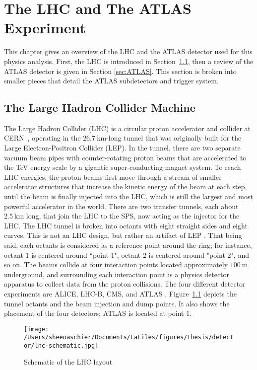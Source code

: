 \chapter{The LHC and The ATLAS Experiment}
\label{ch:detector}
This chapter gives an overview of the LHC and the ATLAS detector used for this physics analysis.  First, the LHC is introduced in Section~\ref{sec:LHC}, then a review of the ATLAS detector is given in Section \ref{sec:ATLAS}.  This section is broken into smaller pieces that detail the ATLAS subdetectors and trigger system. %
\section{The Large Hadron Collider Machine}
\label{sec:LHC}

The Large Hadron Collider (LHC) is a circular proton accelerator and collider at CERN~\cite{Evans:2008zzb}, operating in the $26.7~\mathrm{km}$-long tunnel that was originally built for the Large Electron-Positron Collider (LEP).  In the tunnel, there are two separate vacuum beam pipes with counter-rotating proton beams that are accelerated to the TeV energy scale by a gigantic super-conducting magnet system.  To reach LHC energies, the proton beams first move through a stream of smaller accelerator structures that increase the kinetic energy of the beam at each step, until the beam is finally injected into the LHC, which is still the largest and most powerful accelerator in the world.  There are two transfer tunnels, each about $2.5~\mathrm{km}$ long, that join the LHC to the SPS, now acting as the injector for the LHC.  The LHC tunnel is broken into octants with eight straight sides and eight curves.  This is not an LHC design, but rather an artifact of LEP \cite{lep}.   That being said, each octants is considered as a reference point around the ring; for instance, octant 1 is centered around ``point 1", octant 2 is centered around "point 2", and so on.  The beams collide at four interaction points located approximately $100~\mathrm{m}$ underground, and surrounding each interaction point is a physics detector apparatus to collect data from the proton collisions.  The four different detector experiments are ALICE, LHC-B, CMS, and ATLAS \cite{Jean-Luc:841555}.  Figure~\ref{fig:lhc} depicts the tunnel octants and the beam injection and dump points.  It also shows the placement of the four detectors; ATLAS is located at point 1.
  \begin{figure}[tbp]
    \centering
 \texttt{[image: /Users/sheenaschier/Documents/LaFiles/figures/thesis/detector/lhc-schematic.jpg]}
    \caption{Schematic of the LHC layout~\cite{octant}}
   \label{fig:lhc}
 \end{figure}
 
